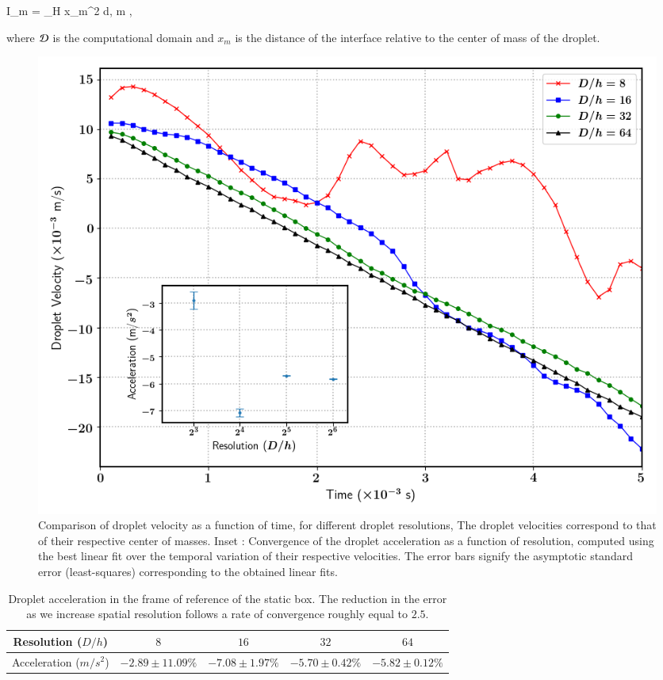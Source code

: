 \be
I_m = \int_\DDD H x_m^2 {\rm d}\X \;,  \le m ,
\nd

where ${\cal D}$ is the computational domain and $x_m$ is the distance of the interface relative to the center of mass of the droplet.   

\begin{figure}[h!]
\begin{center}
\includegraphics[scale = 0.5]{Figures/Sagar/dropl_velocity_accel_ppd.png}
\end{center}
\vspace*{-0.5cm}
\caption{Comparison of droplet velocity as a function of time, for different droplet resolutions, The droplet velocities correspond to that of their respective center of masses. Inset : Convergence of the droplet acceleration as a function of resolution, computed using the best linear fit over the temporal variation of their respective velocities. The error bars signify the asymptotic standard error (least-squares) corresponding to the obtained linear fits.} 
\label{drop_vel}
\end{figure}

\begin{table}[h!]
\begin{center}
	\hspace*{-0.7cm}
\begin{tabular}{|c|c|c|c|c|}
\hline
Resolution ($D/h$) & $8$ & $16$ & $32$ & $64$ \\
\hline
Acceleration ($m/s^2$) & $-2.89 \pm 11.09\%$ & $-7.08 \pm 1.97\%$ & $-5.70 \pm 0.42\%$ & $-5.82 \pm 0.12\%$ \\ 
\hline
\end{tabular}
\caption{Droplet acceleration in the frame of reference of the static box. The reduction in the error as we increase spatial resolution follows a rate of convergence roughly equal to $2.5$.  \label{acc_err}}
\end{center}
\end{table}

